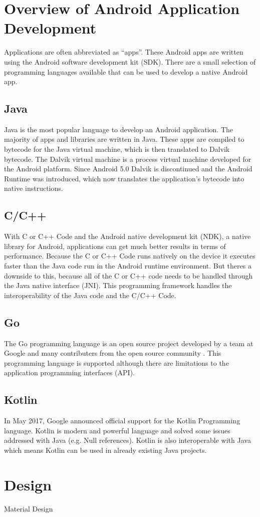\section{Overview of Android Application Development}
 Applications are often abbreviated as ``apps''. These Android apps are written using the Android software development kit (SDK). There are a small selection of programming languages available that can be used to develop a native Android app.

\subsection{Java}
Java is the most popular language to develop an Android application. The majority of apps and libraries are written in Java. These apps are compiled to bytecode for the Java virtual machine, which is then translated to Dalvik bytecode. The Dalvik virtual machine is a process virtual machine developed for the Android platform. Since Android 5.0 Dalvik is discontinued and the Android Runtime was introduced, which now translates the application's bytecode into native instructions.

\subsection{C/C++}
With C or C++ Code and the Android native development kit (NDK), a native library for Android, applications can get much better results in terms of performance. Because the C or C++ Code runs natively on the device it executes faster than the Java code run in the Android runtime environment. But theres a downside to this, because all of the C or C++ code needs to be handled through the Java native interface (JNI). This programming framework handles the interoperability of the Java code and the C/C++ Code.
\subsection{Go}
The Go programming language is an open source project developed by a team at Google and many contributers from the open source community \cite{GoProject}. This programming language is supported although there are limitations to the application programming interfaces (API).

\subsection{Kotlin}
In May 2017, Google announced official support for the Kotlin Programming language. Kotlin is modern and powerful language and solved some issues addressed with Java (e.g. Null references). Kotlin is also interoperable with Java which means Kotlin can be used in already existing Java projects.

\section{Design}
Material Design